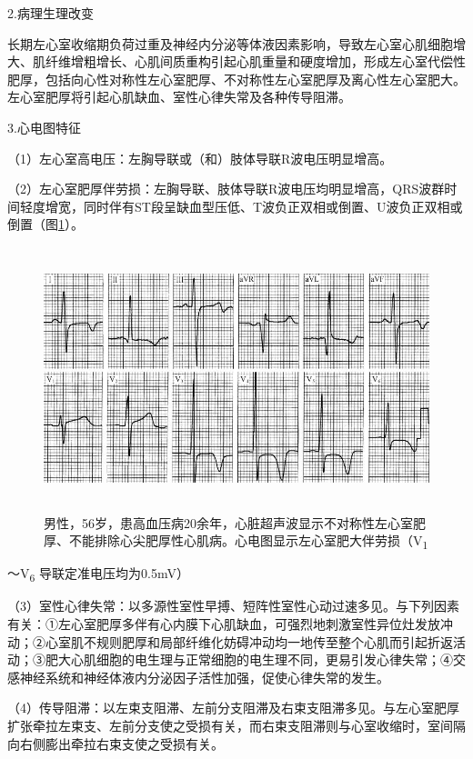 2.病理生理改变

长期左心室收缩期负荷过重及神经内分泌等体液因素影响，导致左心室心肌细胞增大、肌纤维增粗增长、心肌间质重构引起心肌重量和硬度增加，形成左心室代偿性肥厚，包括向心性对称性左心室肥厚、不对称性左心室肥厚及离心性左心室肥大。左心室肥厚将引起心肌缺血、室性心律失常及各种传导阻滞。

3.心电图特征

（1）左心室高电压：左胸导联或（和）肢体导联R波电压明显增高。

（2）左心室肥厚伴劳损：左胸导联、肢体导联R波电压均明显增高，QRS波群时间轻度增宽，同时伴有ST段呈缺血型压低、T波负正双相或倒置、U波负正双相或倒置（图\ref{fig42-5}）。

\begin{figure}[!htbp]
 \centering
 \includegraphics[width=5.58333in,height=3.02083in]{./images/Image00696.jpg}
 \captionsetup{justification=centering}
 \caption{男性，56岁，患高血压病20余年，心脏超声波显示不对称性左心室肥厚、不能排除心尖肥厚性心肌病。心电图显示左心室肥大伴劳损（V\textsubscript{1}}
 \label{fig42-5}
  \end{figure} 
～V\textsubscript{6} 导联定准电压均为0.5mV）

（3）室性心律失常：以多源性室性早搏、短阵性室性心动过速多见。与下列因素有关：①左心室肥厚多伴有心内膜下心肌缺血，可强烈地刺激室性异位灶发放冲动；②心室肌不规则肥厚和局部纤维化妨碍冲动均一地传至整个心肌而引起折返活动；③肥大心肌细胞的电生理与正常细胞的电生理不同，更易引发心律失常；④交感神经系统和神经体液内分泌因子活性加强，促使心律失常的发生。

（4）传导阻滞：以左束支阻滞、左前分支阻滞及右束支阻滞多见。与左心室肥厚扩张牵拉左束支、左前分支使之受损有关，而右束支阻滞则与心室收缩时，室间隔向右侧膨出牵拉右束支使之受损有关。

\protect\hypertarget{text00050.htmlux5cux23subid595}{}{}

